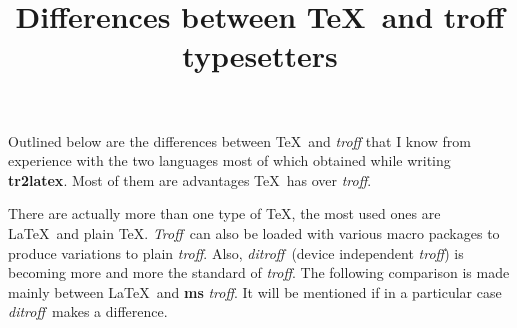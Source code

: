 
\def\troff{{\it troff}}
\def\Troff{{\it Troff}}
\def\ditroff{{\it ditroff}}
\def\Ditroff{{\it Ditroff}}

\title{Differences between \TeX\ and troff typesetters}

Outlined below are the differences between \TeX\ and \troff\/ that
I know from experience with the two languages most of which
obtained while writing {\bf tr2latex}.
Most of them are advantages \TeX\ has over \troff.

There are actually more than one type of \TeX, the most
used ones are \LaTeX\ and plain \TeX.
\Troff\ can also be loaded with various macro packages to
produce variations to plain \troff. Also, \ditroff\ (device independent \troff)
is becoming more and more the standard of \troff.
The following comparison is made mainly between \LaTeX\ and {\bf ms} \troff.
It will be mentioned if in a particular case \ditroff\ makes a difference.

